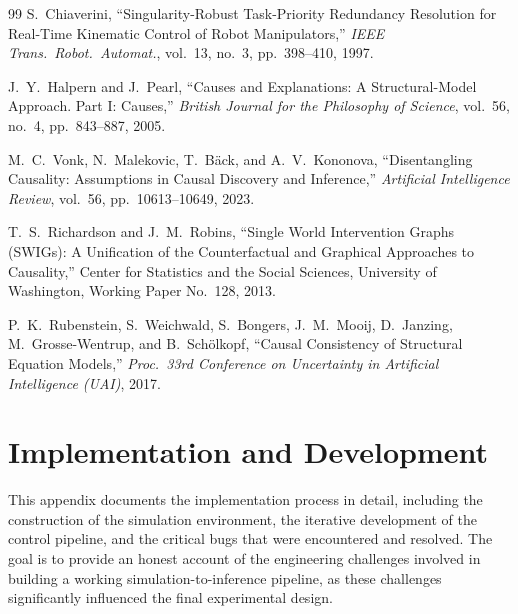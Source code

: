 \documentclass[11pt,a4paper]{report}
\begin{document}
\begin{thebibliography}{99}
S.~Chiaverini, ``Singularity-Robust Task-Priority Redundancy Resolution
for Real-Time Kinematic Control of Robot Manipulators,''
\emph{IEEE Trans.\ Robot.\ Automat.}, vol.~13, no.~3,
pp.~398--410, 1997.

J.~Y.~Halpern and J.~Pearl,
``Causes and Explanations: A Structural-Model Approach. Part I: Causes,''
\emph{British Journal for the Philosophy of Science}, vol.~56, no.~4,
pp.~843--887, 2005.

M.~C.~Vonk, N.~Malekovic, T.~B\"ack, and A.~V.~Kononova,
``Disentangling Causality: Assumptions in Causal Discovery and Inference,''
\emph{Artificial Intelligence Review}, vol.~56, pp.~10613--10649, 2023.

T.~S.~Richardson and J.~M.~Robins,
``Single World Intervention Graphs (SWIGs): A Unification of the
Counterfactual and Graphical Approaches to Causality,''
Center for Statistics and the Social Sciences, University of Washington,
Working Paper No.~128, 2013.

P.~K.~Rubenstein, S.~Weichwald, S.~Bongers, J.~M.~Mooij, D.~Janzing,
M.~Grosse-Wentrup, and B.~Sch\"olkopf,
``Causal Consistency of Structural Equation Models,''
\emph{Proc.\ 33rd Conference on Uncertainty in Artificial Intelligence
(UAI)}, 2017.

\end{thebibliography}

\appendix

\chapter{Implementation and Development}
\label{app:implementation}

This appendix documents the implementation process in detail, including the construction of the simulation environment, the iterative development of the control pipeline, and the critical bugs that were encountered and resolved. The goal is to provide an honest account of the engineering challenges involved in building a working simulation-to-inference pipeline, as these challenges significantly influenced the final experimental design.
\end{document}

